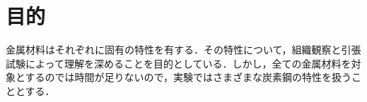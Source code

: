 %
%
%
\section{目的}
\label{purpose}
金属材料はそれぞれに固有の特性を有する．その特性について，組織観察と引張試験によって理解を深めることを目的としている．しかし，全ての金属材料を対象とするのでは時間が足りないので，実験ではさまざまな炭素鋼の特性を扱うこととする．
